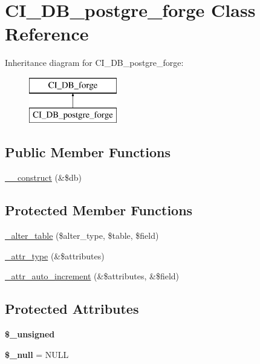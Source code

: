 \hypertarget{class_c_i___d_b__postgre__forge}{}\section{C\+I\+\_\+\+D\+B\+\_\+postgre\+\_\+forge Class Reference}
\label{class_c_i___d_b__postgre__forge}
Inheritance diagram for C\+I\+\_\+\+D\+B\+\_\+postgre\+\_\+forge\+:\begin{figure}[H]
\begin{center}
\leavevmode
\includegraphics[height=2.000000cm]{class_c_i___d_b__postgre__forge}
\end{center}
\end{figure}
\subsection*{Public Member Functions}
\begin{DoxyCompactItemize}
\item 
\mbox{\hyperlink{class_c_i___d_b__postgre__forge_acb9e96ebb1c35461a6abbb5fdc131267}{\+\_\+\+\_\+construct}} (\&\$db)
\end{DoxyCompactItemize}
\subsection*{Protected Member Functions}
\begin{DoxyCompactItemize}
\item 
\mbox{\hyperlink{class_c_i___d_b__postgre__forge_a52fe37c1ca0f56d82748a0324c4c6afc}{\+\_\+alter\+\_\+table}} (\$alter\+\_\+type, \$table, \$field)
\item 
\mbox{\hyperlink{class_c_i___d_b__postgre__forge_a320735fa62b1bdb2822faa62c3100900}{\+\_\+attr\+\_\+type}} (\&\$attributes)
\item 
\mbox{\hyperlink{class_c_i___d_b__postgre__forge_a77e877715c2f19dd977ce3c3fdba6ae5}{\+\_\+attr\+\_\+auto\+\_\+increment}} (\&\$attributes, \&\$field)
\end{DoxyCompactItemize}
\subsection*{Protected Attributes}
\begin{DoxyCompactItemize}
\item 
{\bfseries \$\+\_\+unsigned}
\item 
\mbox{\label{class_c_i___d_b__postgre__forge_a94a4c4971dbbc4543a9d14f5932fc36c}} 
{\bfseries \$\+\_\+null} = \textquotesingle{}N\+U\+LL\textquotesingle{}
\end{DoxyCompactItemize}
